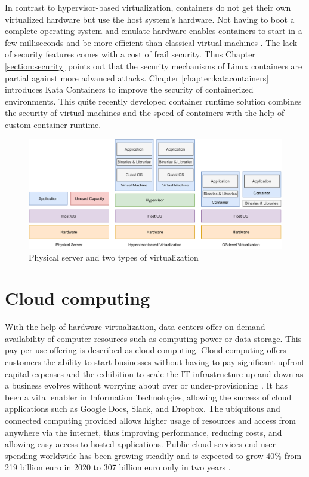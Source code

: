 In contrast to hypervisor-based virtualization, containers do not get their own virtualized hardware but use the host system's hardware. Not having to boot a complete operating system and emulate hardware enables containers to start in a few milliseconds and be more efficient than classical virtual machines \cite{Eder2016}. The lack of security features comes with a cost of frail security. Thus Chapter \ref{section:security} points out that the security mechanisms of Linux containers are partial against more advanced attacks. Chapter \ref{chapter:katacontainers} introduces Kata Containers to improve the security of containerized environments. This quite recently developed container runtime solution combines the security of virtual machines and the speed of containers with the help of custom container runtime.

\begin{figure}[ht]
  \begin{center}
    \includegraphics[width=13.5cm]{images/VirtualizationTypes.pdf}
    \caption{Physical server and two types of virtualization}
    \label{fig:VirtualizationTypes}
  \end{center}
\end{figure}

\section{Cloud computing}

With the help of hardware virtualization, data centers offer on-demand availability of computer resources such as computing power or data storage. This pay-per-use offering is described as cloud computing. Cloud computing offers customers the ability to start businesses without having to pay significant upfront capital expenses and the exhibition to scale the IT infrastructure up and down as a business evolves without worrying about over or under-provisioning \cite{Xing2012}. It has been a vital enabler in Information Technologies, allowing the success of cloud applications such as Google Docs, Slack, and Dropbox. The ubiquitous and connected computing provided allows higher usage of resources and access from anywhere via the internet, thus improving performance, reducing costs, and allowing easy access to hosted applications. Public cloud services end-user spending worldwide has been growing steadily and is expected to grow 40\% from 219 billion euro in 2020 to 307 billion euro only in two years \cite{PublicCloudStatista}.


